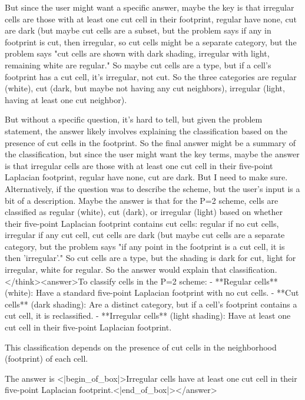 But since the user might want a specific answer, maybe the key is that irregular cells are those with at least one cut cell in their footprint, regular have none, cut are dark (but maybe cut cells are a subset, but the problem says if any in footprint is cut, then irregular, so cut cells might be a separate category, but the problem says "cut cells are shown with dark shading, irregular with light, remaining white are regular." So maybe cut cells are a type, but if a cell's footprint has a cut cell, it's irregular, not cut. So the three categories are regular (white), cut (dark, but maybe not having any cut neighbors), irregular (light, having at least one cut neighbor). 

But without a specific question, it's hard to tell, but given the problem statement, the answer likely involves explaining the classification based on the presence of cut cells in the footprint. So the final answer might be a summary of the classification, but since the user might want the key terms, maybe the answer is that irregular cells are those with at least one cut cell in their five-point Laplacian footprint, regular have none, cut are dark. But I need to make sure. Alternatively, if the question was to describe the scheme, but the user's input is a bit of a description. Maybe the answer is that for the P=2 scheme, cells are classified as regular (white), cut (dark), or irregular (light) based on whether their five-point Laplacian footprint contains cut cells: regular if no cut cells, irregular if any cut cell, cut cells are dark (but maybe cut cells are a separate category, but the problem says "if any point in the footprint is a cut cell, it is then 'irregular'." So cut cells are a type, but the shading is dark for cut, light for irregular, white for regular. So the answer would explain that classification.</think><answer>To classify cells in the P=2 scheme:  
- **Regular cells** (white): Have a standard five-point Laplacian footprint with no cut cells.  
- **Cut cells** (dark shading): Are a distinct category, but if a cell’s footprint contains a cut cell, it is reclassified.  
- **Irregular cells** (light shading): Have at least one cut cell in their five-point Laplacian footprint.  

This classification depends on the presence of cut cells in the neighborhood (footprint) of each cell.  

The answer is <|begin_of_box|>Irregular cells have at least one cut cell in their five-point Laplacian footprint.<|end_of_box|></answer>